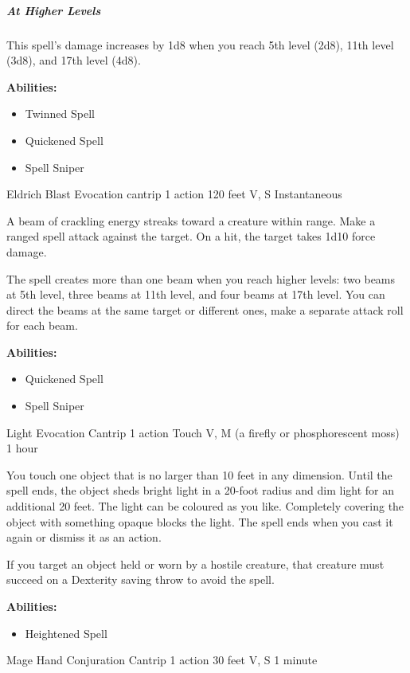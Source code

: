 \documentclass[letterpaper,openany,oneside,twocolumn]{book}
\begin{document}
\subparagraph*{At Higher Levels} This spell's damage increases by 1d8 when you reach 5th level (2d8), 11th level (3d8), and 17th level (4d8).

\textbf{Abilities:}
\begin{itemize}
  \item Twinned Spell
  \item Quickened Spell
  \item Spell Sniper
\end{itemize}


\DndSpellHeader
  {Eldrich Blast}
  {Evocation cantrip}
  {1 action}
  {120 feet}
  {V, S}
  {Instantaneous}

A beam of crackling energy streaks toward a creature within range. Make a ranged spell attack against the target. On a hit, the target takes 1d10 force damage.

The spell creates more than one beam when you reach higher levels: two beams at 5th level, three beams at 11th level, and four beams at 17th level. You can direct the beams at the same target or different ones, make a separate attack roll for each beam.

\textbf{Abilities:}
\begin{itemize}
  \item Quickened Spell
  \item Spell Sniper
\end{itemize}

\DndSpellHeader
  {Light}
  {Evocation Cantrip}
  {1 action}
  {Touch}
  {V, M (a firefly or phosphorescent moss)}
  {1 hour}

You touch one object that is no larger than 10 feet in any dimension. Until the spell ends, the object sheds bright light in a 20-foot radius and dim light for an additional 20 feet. The light can be coloured as you like. Completely covering the object with something opaque blocks the light. The spell ends when you cast it again or dismiss it as an action.

If you target an object held or worn by a hostile creature, that creature must succeed on a Dexterity saving throw to avoid the spell.

\textbf{Abilities:}
\begin{itemize}
  \item Heightened Spell
\end{itemize}

\DndSpellHeader
  {Mage Hand}
  {Conjuration Cantrip}
  {1 action}
  {30 feet}
  {V, S}
  {1 minute}
\end{document}
